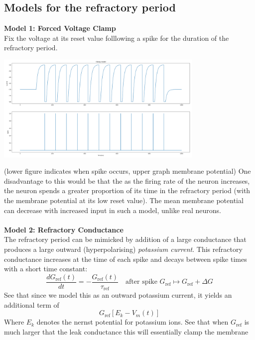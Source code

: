 \documentclass{report}
\begin{document}
\subsection{Models for the refractory period}
\textbf{Model 1: Forced Voltage Clamp}\\
Fix the voltage at its reset value folllowing a spike for the duration of the refractory period.
\begin{center}
\includegraphics[width=10cm]{6}\\
\end{center}
(lower figure indicates when spike occurs, upper graph membrane potential)
One disadvantage to this would be that the as the firing rate of the neuron increases, the neuron spends a greater proportion of its time in the refractory period 
(with the membrane potential at its low reset value). The mean membrane potential can decrease with increased input in such a model, unlike real neurons.\\
\vspace{1mm}\\
\textbf{Model 2: Refractory Conductance}\\
The refractory period can be mimicked by addition of a large conductance that produces a large outward (hyperpolarising) \textit{potassium current}. This refractory
conductance increases at the time of each spike and decays between spike times with a short time constant:
\begin{equation*}
\frac{dG_{\text{ref}}(t)}{dt}=-\frac{G_{\text{ref}}(t)}{\tau_{\text{ref}}}\quad\text{after spike }G_{\text{ref}}\mapsto G_{\text{ref}}+\Delta G
\end{equation*}
See that since we model this as an outward potassium current, it yields an additional term of
\begin{equation*}
G_{\text{ref}}[E_k-V_m(t)]
\end{equation*}
Where $E_k$ denotes the nernst potential for potassium ions. See that when $G_{\text{ref}}$ is much larger that the leak conductance this will essentially clamp the membrane
\end{document}

